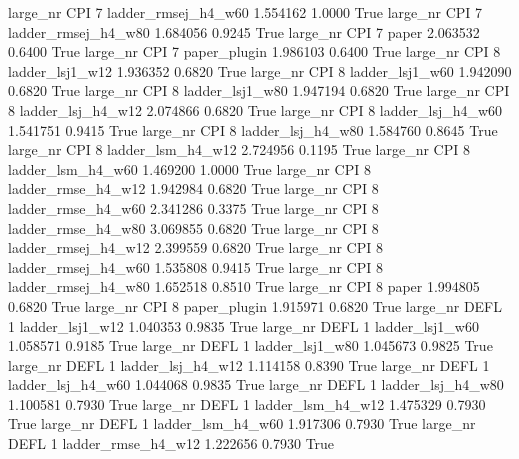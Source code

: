  large_nr      CPI                 7 ladder_rmsej_h4_w60    1.554162      1.0000    True
  large_nr      CPI                 7 ladder_rmsej_h4_w80    1.684056      0.9245    True
  large_nr      CPI                 7               paper    2.063532      0.6400    True
  large_nr      CPI                 7        paper_plugin    1.986103      0.6400    True
  large_nr      CPI                 8     ladder_lsj1_w12    1.936352      0.6820    True
  large_nr      CPI                 8     ladder_lsj1_w60    1.942090      0.6820    True
  large_nr      CPI                 8     ladder_lsj1_w80    1.947194      0.6820    True
  large_nr      CPI                 8   ladder_lsj_h4_w12    2.074866      0.6820    True
  large_nr      CPI                 8   ladder_lsj_h4_w60    1.541751      0.9415    True
  large_nr      CPI                 8   ladder_lsj_h4_w80    1.584760      0.8645    True
  large_nr      CPI                 8   ladder_lsm_h4_w12    2.724956      0.1195    True
  large_nr      CPI                 8   ladder_lsm_h4_w60    1.469200      1.0000    True
  large_nr      CPI                 8  ladder_rmse_h4_w12    1.942984      0.6820    True
  large_nr      CPI                 8  ladder_rmse_h4_w60    2.341286      0.3375    True
  large_nr      CPI                 8  ladder_rmse_h4_w80    3.069855      0.6820    True
  large_nr      CPI                 8 ladder_rmsej_h4_w12    2.399559      0.6820    True
  large_nr      CPI                 8 ladder_rmsej_h4_w60    1.535808      0.9415    True
  large_nr      CPI                 8 ladder_rmsej_h4_w80    1.652518      0.8510    True
  large_nr      CPI                 8               paper    1.994805      0.6820    True
  large_nr      CPI                 8        paper_plugin    1.915971      0.6820    True
  large_nr     DEFL                 1     ladder_lsj1_w12    1.040353      0.9835    True
  large_nr     DEFL                 1     ladder_lsj1_w60    1.058571      0.9185    True
  large_nr     DEFL                 1     ladder_lsj1_w80    1.045673      0.9825    True
  large_nr     DEFL                 1   ladder_lsj_h4_w12    1.114158      0.8390    True
  large_nr     DEFL                 1   ladder_lsj_h4_w60    1.044068      0.9835    True
  large_nr     DEFL                 1   ladder_lsj_h4_w80    1.100581      0.7930    True
  large_nr     DEFL                 1   ladder_lsm_h4_w12    1.475329      0.7930    True
  large_nr     DEFL                 1   ladder_lsm_h4_w60    1.917306      0.7930    True
  large_nr     DEFL                 1  ladder_rmse_h4_w12    1.222656      0.7930    True
